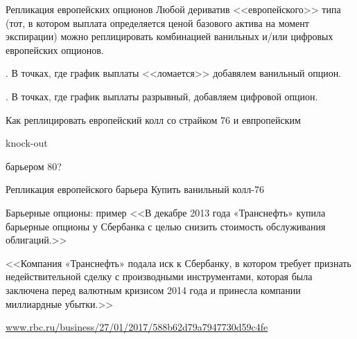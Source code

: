 \documentclass{beamer}
\newcommand{\en}[1]{\begin{otherlanguage}{english}#1\end{otherlanguage}}
\begin{document}
\begin{frame}{Репликация европейских опционов}
\justify
Любой дериватив <<европейского>> типа (тот, в котором выплата определяется ценой 
базового актива на момент экспирации) можно реплицировать комбинацией ванильных и/или
цифровых европейских опционов.

. В точках, где график выплаты <<ломается>> добавялем ванильный опцион.

. В точках, где график выплаты разрывный, добавляем цифровой опцион.

\justify
Как реплицировать европейский колл со страйком 76 и евпропейским \en{knock-out} 
барьером 80?
\end{frame}



\begin{frame}{Репликация европейского барьера}
\justify
Купить ванильный колл-76
\justify
\centering
\end{frame}



\begin{frame}{Барьерные опционы: пример}
\justify
<<В декабре 2013 года «Транснефть» купила барьерные опционы у Сбербанка с целью снизить стоимость обслуживания облигаций.>>

\justify
<<Компания «Транснефть» подала иск к Сбербанку, в котором требует признать недействительной сделку с производными инструментами, которая была заключена перед валютным кризисом 2014 года и принесла компании миллиардные убытки.>>

\justify
\small
\url{www.rbc.ru/business/27/01/2017/588b62d79a7947730d59c4fe}
\end{frame}
\end{document}
